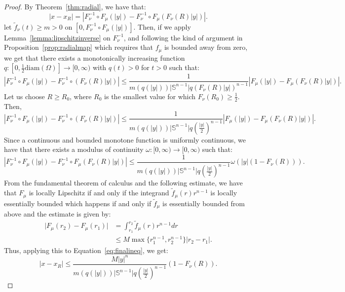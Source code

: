 \documentclass{amsart}
\theoremstyle{lemma}
\theoremstyle{remark}
\begin{document}
\begin{proof}
By Theorem~\ref{thm:radial}, we have that:
\begin{equation}
\vert x - x_R \vert = \left\vert F_{\nu}^{-1} \circ F_{\mu} (\vert y \vert) - F_{\nu}^{-1} \circ F_{\mu}(F_{\nu}(R) \vert y \vert) \right\vert.
\end{equation}
let $\tilde{f}_{\nu}(t)\geq m >0$ on $[0, F_{\nu}^{-1} \circ F_{\mu}(\vert y \vert)]$. Then, if we apply Lemma~\ref{lemma:lipschitzinverse} on $F_{\nu}^{-1}$, and following the kind of argument in Proposition~\ref{prop:radialmap} which requires that $f_{\mu}$ is bounded away from zero, we get that there exists a monotonically increasing function $q: [0, \frac{1}{2} \text{diam}(\Omega)] \rightarrow [0, \infty)$ with $q(t)>0$ for $t>0$ such that:
\begin{equation}
\left\vert F_{\nu}^{-1} \circ F_{\mu} (\vert y \vert) - F_{\nu}^{-1} \circ (F_{\nu}(R) \vert y \vert) \right\vert \leq \frac{1}{m(q(\vert y \vert)) \vert \mathbb{S}^{n-1} \vert q(F_{\nu}(R) \vert y \vert)^{n-1}} \left\vert F_{\mu}(\vert y \vert) - F_{\mu}(F_{\nu}(R) \vert y \vert) \right\vert.
\end{equation}
Let us choose $R \geq R_0$, where $R_0$ is the smallest value for which $F_{\nu}(R_0) \geq \frac{1}{2}$. Then,
\begin{equation}
\left\vert F_{\nu}^{-1} \circ F_{\mu} (\vert y \vert) - F_{\nu}^{-1} \circ (F_{\nu}(R) \vert y \vert) \right\vert \leq \frac{1}{m(q(\vert y \vert)) \vert \mathbb{S}^{n-1} \vert q\left( \frac{\vert y \vert}{2} \right)^{n-1}} \left\vert F_{\mu}(\vert y \vert) - F_{\mu}(F_{\nu}(R) \vert y \vert) \right\vert.
\end{equation}
Since a continuous and bounded monotone function is uniformly continuous, we have that there exists a modulus of continuity $\omega :[0, \infty) \rightarrow [0, \infty)$ such that:
\begin{equation}\label{eq:finalineq}
 \left\vert F_{\nu}^{-1} \circ F_{\mu}(\vert y \vert) - F_{\nu}^{-1} \circ F_{\mu}(F_{\nu}(R) \vert y \vert) \right\vert \leq \frac{1}{m(q(\vert y \vert)) \vert \mathbb{S}^{n-1} \vert q\left( \frac{\vert y \vert}{2} \right)^{n-1}} \omega(\vert y \vert (1 - F_{\nu}(R))).
\end{equation}
From the fundamental theorem of calculus and the following estimate, we have that $F_{\mu}$ is locally Lipschitz if and only if the integrand $\tilde{f}_{\mu}(r)r^{n-1}$ is locally essentially bounded which happens if and only if $\tilde{f}_{\mu}$ is essentially bounded from above and the estimate is given by:
\begin{align}
\vert F_{\mu}(r_2) - F_{\mu}(r_1) \vert &= \int_{r_1}^{r_2} \tilde{f}_{\mu}(r) r^{n-1} dr \\
&\leq M \max \{r_1^{n-1}, r_2^{n-1} \} \vert r_2 - r_1 \vert.
\end{align}
Thus, applying this to Equation~\eqref{eq:finalineq}, we get:
\begin{equation}
\left\vert x - x_R \right\vert \leq \frac{M \vert y \vert^n}{m(q(\vert y \vert)) \vert \mathbb{S}^{n-1} \vert q\left( \frac{\vert y \vert}{2} \right)^{n-1}} (1 - F_{\nu}(R)).
\end{equation}
\end{proof}
\end{document}
